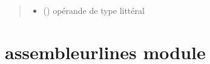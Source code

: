 \documentclass[letterpaper,10pt,french]{sphinxmanual}
\begin{document}
\begin{fulllineitems}
\begin{fulllineitems}
\begin{quote}
\begin{description}
\begin{itemize}
\item {} 
 (\sphinxstyleliteralemphasis{\sphinxupquote{{[}}}{\hyperref[\detokenize{litteral:litteral.Litteral}]{\sphinxcrossref{\sphinxstyleliteralemphasis{\sphinxupquote{Litteral}}}}}\sphinxstyleliteralemphasis{\sphinxupquote{{]}}}) \textendash{} opérande de type littéral

\end{itemize}

\end{description}\end{quote}

\end{fulllineitems}


\end{fulllineitems}



\section{assembleurlines module}
\label{\detokenize{assembleurlines:module-assembleurlines}}\label{\detokenize{assembleurlines:assembleurlines-module}}\label{\detokenize{assembleurlines::doc}}\label{\detokenize{assembleurlines:module-assembleurlines}}
\end{document}
